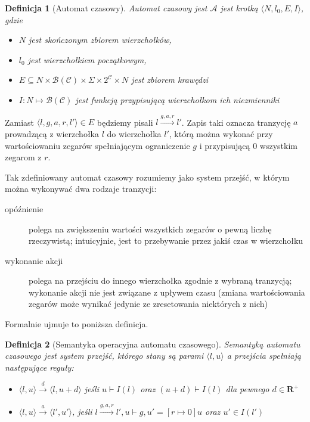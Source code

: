 \documentclass{pracamgr}
\newcommand{\pair}[2]{\langle #1, #2 \rangle}
\theoremstyle{plain}
\newtheorem{definition}{Definicja}
\begin{document}
\begin{definition}[Automat czasowy] Automat czasowy jest $\mathcal{A}$
jest krotką $\langle N, l_0, E, I\rangle$, gdzie
  \begin{itemize}
    \item $N$ jest skończonym zbiorem wierzchołków,
    \item $l_0$ jest wierzchołkiem początkowym,
    \item $E \subseteq N \times \mathcal{B}(\mathcal{C}) \times \Sigma
    \times 2^{\mathcal{C}} \times N$ jest zbiorem krawędzi
    \item $I: N \mapsto \mathcal{B}(\mathcal{C})$ jest funkcją
    przypisującą wierzchołkom ich niezmienniki
  \end{itemize}
\end{definition}
Zamiast $\langle l, g, a, r, l' \rangle \in E$ będziemy pisali $l
\stackrel{g, a, r}{\longrightarrow} l'$. Zapis taki oznacza tranzycję
$a$ prowadzącą z wierzchołka $l$ do wierzchołka $l'$, którą można
wykonać przy wartościowaniu zegarów spełniającym ograniczenie $g$ i
przypisującą $0$ wszystkim zegarom z $r$.

Tak zdefiniowany automat czasowy rozumiemy jako
system przejść, w którym można wykonywać dwa rodzaje tranzycji:
\begin{description}
  \item[opóźnienie] polega na zwiększeniu wartości wszystkich zegarów
  o pewną liczbę rzeczywistą; intuicyjnie, jest to przebywanie przez
  jakiś czas w wierzchołku
  \item[wykonanie akcji] polega na przejściu do innego wierzchołka
  zgodnie z wybraną tranzycją; wykonanie akcji nie jest związane z
  upływem czasu (zmiana wartościowania zegarów może wynikać jedynie ze
  zresetowania niektórych z nich)
\end{description}
Formalnie ujmuje to poniższa definicja.
\begin{definition}[Semantyka operacyjna automatu czasowego] Semantyką
  automatu czasowego jest system przejść, którego stany są parami
$\langle l, u \rangle$ a przejścia spełniają następujące reguły:
  \begin{itemize}
    \item $\pair{l}{u} \stackrel{d}{\longrightarrow} \pair{l}{u+d}$
    jeśli $u \vdash I(l)$ oraz $(u+d) \vdash I(l)$ dla pewnego $d \in
    \mathbf{R}^{+}$
    \item $\pair{l}{u} \stackrel{a}{\longrightarrow} \pair{l'}{u'}$,
    jeśli $l \stackrel{g, a, r}{\longrightarrow} l', u \vdash g, u' =
    [r \mapsto 0]u$ oraz $u' \in I(l')$
  \end{itemize}
\end{definition}
\end{document}
